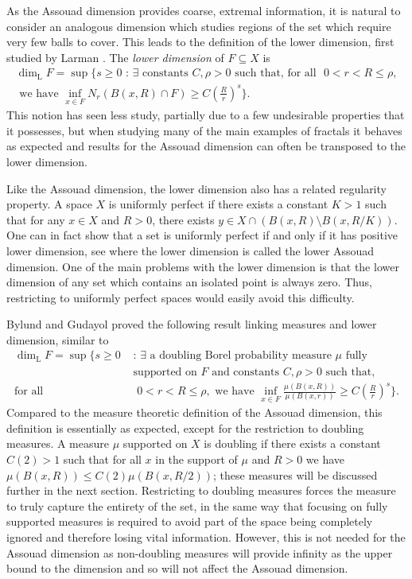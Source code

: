 As the Assouad dimension provides coarse, extremal information, it is natural to consider an analogous dimension which studies regions of the set which require very few balls to cover. This leads to the definition of the lower dimension, first studied by Larman \cite{larman1,larman2}. The \textit{lower dimension} of $F \subseteq X$ is 
\begin{multline*}
\dim_{\text{L}} F = \sup \Bigg\{ s \geq 0 \, \,  : \, \exists \text{ constants }C, \rho > 0 \text{ such that, for all } \, \, 0< r< R \leq \rho,\\ \text{ we have  }\inf_{x\in F} N_r (B(x,R)\cap F) \geq C\left(\frac{R}{r}\right)^{s} \Bigg\}.
\end{multline*}
This notion has seen less study, partially due to a few undesirable properties that it possesses, but when studying many of the main examples of fractals it behaves as expected and results for the Assouad dimension can often be transposed to the lower dimension. 

Like the Assouad dimension, the lower dimension also has a related regularity property. A space $X$ is uniformly perfect if there exists a constant $K > 1$ such that for any $x \in X$ and $R > 0$, there exists $y \in X \cap \left(B(x, R) \setminus B(x, R/K)\right)$. One can in fact show that a set is uniformly perfect if and only if it has positive lower dimension, see \cite[Lemma 2.1]{anti1} where the lower dimension is called the lower Assouad dimension. One of the main problems with the lower dimension is that the lower dimension of any set which contains an isolated point is always zero. Thus, restricting to uniformly perfect spaces would easily avoid this difficulty. 

Bylund and Gudayol \cite{bylund} proved the following result linking measures and lower dimension, similar to \cite{luksak, konyagin}
\begin{align*}
\dim_{\text{L}} F = \sup \Bigg\{ s \geq 0 \, \,  &: \, \exists \text{ a doubling Borel probability measure } \mu \text{ fully } \\  
&\text{supported on }F \text{ and constants }C, \rho > 0  \text{ such that, } \\ 
\text{for all } &\, \, 0< r< R \leq \rho, \text{ we have  }\inf_{x\in F} \frac{\mu(B(x,R))}{\mu(B(x,r))} \geq C\left(\frac{R}{r}\right)^{s} \Bigg\}.
\end{align*}
Compared to the measure theoretic definition of the Assouad dimension, this definition is essentially as expected, except for the restriction to doubling measures. A measure $\mu$ supported on $X$ is doubling if there exists a constant $C(2) > 1$ such that for all $x$ in the support of $\mu$ and $R > 0$ we have $\mu( B(x,R)) \le C(2) \mu(B(x,R/2))$; these measures will be discussed further in the next section. Restricting to doubling measures forces the measure to truly capture the entirety of the set, in the same way that focusing on fully supported measures is required to avoid part of the space being completely ignored and therefore losing vital information. However, this is not needed for the Assouad dimension as non-doubling measures will provide infinity as the upper bound to the dimension and so will not affect the Assouad dimension. 


